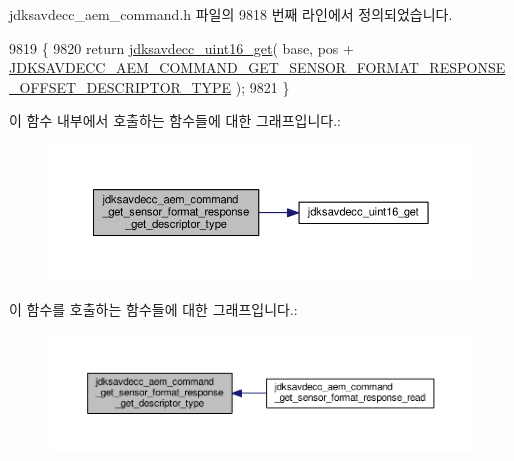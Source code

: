 jdksavdecc\+\_\+aem\+\_\+command.\+h 파일의 9818 번째 라인에서 정의되었습니다.


\begin{DoxyCode}
9819 \{
9820     \textcolor{keywordflow}{return} \hyperlink{group__endian_ga3fbbbc20be954aa61e039872965b0dc9}{jdksavdecc\_uint16\_get}( base, pos + 
      \hyperlink{group__command__get__sensor__format__response_gac311d41c6823d30cb7b5664683db492b}{JDKSAVDECC\_AEM\_COMMAND\_GET\_SENSOR\_FORMAT\_RESPONSE\_OFFSET\_DESCRIPTOR\_TYPE}
       );
9821 \}
\end{DoxyCode}


이 함수 내부에서 호출하는 함수들에 대한 그래프입니다.\+:
\nopagebreak
\begin{figure}[H]
\begin{center}
\leavevmode
\includegraphics[width=350pt]{group__command__get__sensor__format__response_ga95629c7b418d2af5b65d61d23dbe6300_cgraph}
\end{center}
\end{figure}




이 함수를 호출하는 함수들에 대한 그래프입니다.\+:
\nopagebreak
\begin{figure}[H]
\begin{center}
\leavevmode
\includegraphics[width=350pt]{group__command__get__sensor__format__response_ga95629c7b418d2af5b65d61d23dbe6300_icgraph}
\end{center}
\end{figure}


